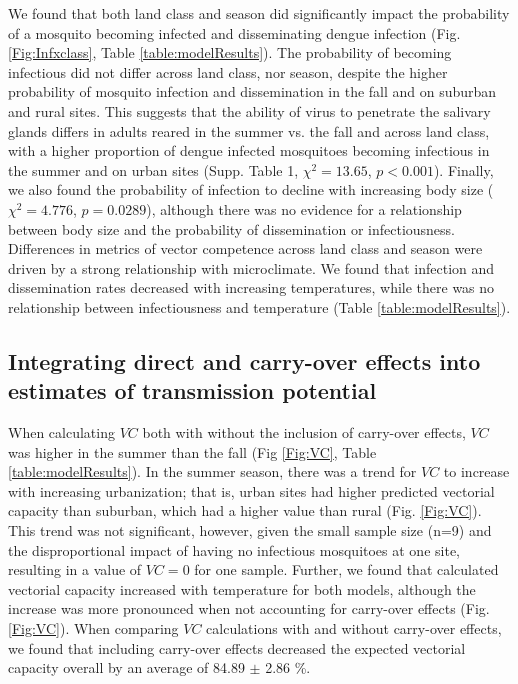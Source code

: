 \documentclass[12pt]{article}
\begin{document}
We found that both land class and season did significantly impact the probability of a mosquito becoming infected and disseminating dengue infection (Fig. \ref{Fig:Infxclass}, Table \ref{table:modelResults}). The probability of becoming infectious did not differ across land class, nor season, despite the higher probability of mosquito infection and dissemination in the fall and on suburban and rural sites. This suggests that the ability of virus to penetrate the salivary glands differs in adults reared in the summer vs. the fall and across land class, with a higher proportion of dengue infected mosquitoes becoming infectious in the summer and on urban sites (Supp. Table 1, $\chi^2=13.65$, $p<0.001$). Finally, we also found the probability of infection to decline with increasing body size ($\chi^2=4.776$, $p=0.0289$), although there was no evidence for a relationship between body size and the probability of dissemination or infectiousness. Differences in metrics of vector competence across land class and season were driven by a strong relationship with microclimate. We found that infection and dissemination rates decreased with increasing temperatures, while there was no relationship between infectiousness and temperature (Table \ref{table:modelResults}).

\subsection{Integrating direct and carry-over effects into estimates of transmission potential}

When calculating $VC$ both with without the inclusion of carry-over effects, $VC$ was higher in the summer than the fall (Fig \ref{Fig:VC}, Table \ref{table:modelResults}). In the summer season, there was a trend for $VC$ to increase with increasing urbanization; that is, urban sites had higher predicted vectorial capacity than suburban, which had a higher value than rural (Fig. \ref{Fig:VC}). This trend was not significant, however, given the small sample size (n=9) and the disproportional impact of having no infectious mosquitoes at one site, resulting in a value of $VC=0$ for one sample. Further, we found that calculated vectorial capacity increased with temperature for both models, although the increase was more pronounced when not accounting for carry-over effects (Fig. \ref{Fig:VC}). When comparing $VC$ calculations with and without carry-over effects, we found that including carry-over effects decreased the expected vectorial capacity overall by an average of 84.89 $\pm$ 2.86 \%.
\end{document}
